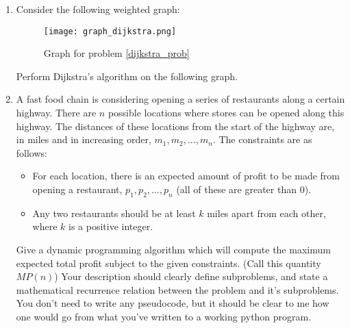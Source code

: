\documentclass[12pt]{article}
\begin{document}
\begin{enumerate}
    \newpage
    \item Consider the following weighted graph:
    \begin{figure}[h]
        \centering
        \caption{Graph for problem \ref{dijkstra_prob}}
        \texttt{[image: graph\_dijkstra.png]}
    \end{figure}
    Perform Dijkstra's algorithm on the following graph. \label{dijkstra_prob}
    \newpage
    \item A fast food chain is considering opening a series of restaurants along a certain highway. There are $n$ possible locations where stores can be opened along this highway. The distances of these locations from the start of the highway are, in miles and in increasing order, $m_1, m_2, \ldots, m_n$. The constraints are as follows:
    \begin{itemize}
        \item For each location, there is an expected amount of profit to be made from opening a restaurant, $p_1, p_2, \ldots, p_n$ (all of these are greater than $0$).
        \item Any two restaurants should be at least $k$ miles apart from each other, where $k$ is a positive integer. 
    \end{itemize} 
    Give a dynamic programming algorithm which will compute the maximum expected total profit subject to the given constraints. (Call this quantity $MP(n)$) Your description should clearly define subproblems, and state a mathematical recurrence relation between the problem and it's subproblems. You don't need to write any pseudocode, but it should be clear to me how one would go from what you've written to a working python program. 
\end{enumerate}
\end{document}
